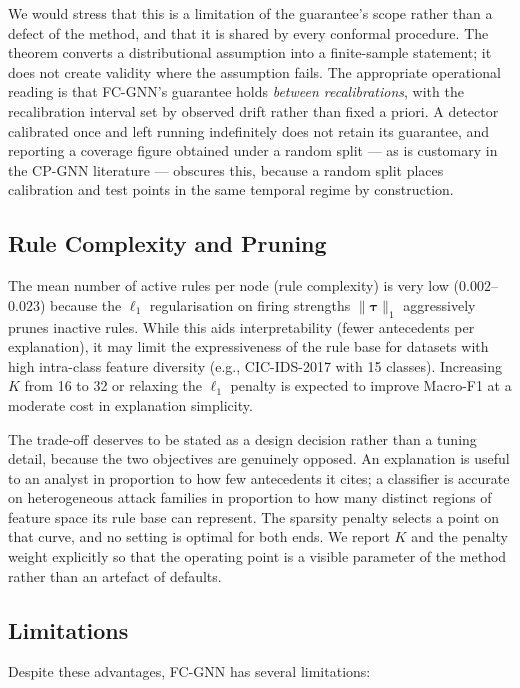 We would stress that this is a limitation of the guarantee's scope rather than a
defect of the method, and that it is shared by every conformal procedure. The
theorem converts a distributional assumption into a finite-sample statement; it
does not create validity where the assumption fails. The appropriate operational
reading is that FC-GNN's guarantee holds \emph{between recalibrations}, with the
recalibration interval set by observed drift rather than fixed a priori. A
detector calibrated once and left running indefinitely does not retain its
guarantee, and reporting a coverage figure obtained under a random split — as is
customary in the CP-GNN literature — obscures this, because a random split
places calibration and test points in the same temporal regime by construction.

\subsection{Rule Complexity and Pruning}

The mean number of active rules per node (rule complexity) is very low
($0.002$--$0.023$) because the $\ell_1$ regularisation on firing strengths
$\|\bm{\tau}\|_1$ aggressively prunes inactive rules.
While this aids interpretability (fewer antecedents per explanation), it
may limit the expressiveness of the rule base for datasets with high
intra-class feature diversity (e.g., CIC-IDS-2017 with 15 classes).
Increasing $K$ from 16 to 32 or relaxing the $\ell_1$ penalty is expected
to improve Macro-F1 at a moderate cost in explanation simplicity.

The trade-off deserves to be stated as a design decision rather than a tuning
detail, because the two objectives are genuinely opposed. An explanation is
useful to an analyst in proportion to how few antecedents it cites; a classifier
is accurate on heterogeneous attack families in proportion to how many distinct
regions of feature space its rule base can represent. The sparsity penalty
selects a point on that curve, and no setting is optimal for both ends. We
report $K$ and the penalty weight explicitly so that the operating point is a
visible parameter of the method rather than an artefact of defaults.

\subsection{Limitations}

Despite these advantages, FC-GNN has several limitations:

